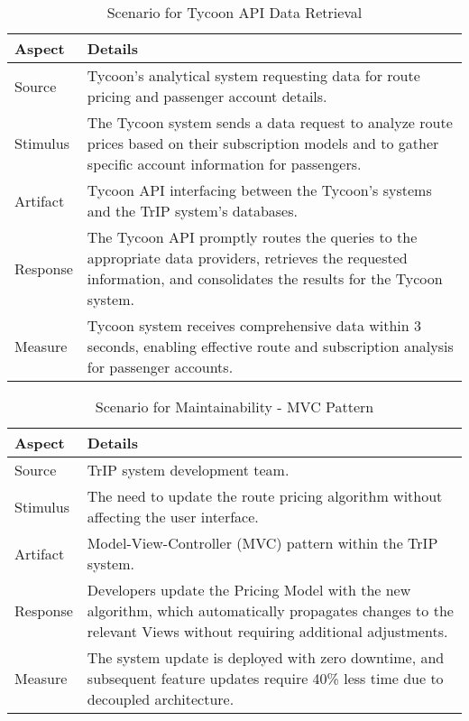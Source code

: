 \begin{table}[H]
    \centering
    \begin{tabularx}{\textwidth}{@{} lX @{}}
    \toprule
    \textbf{Aspect} & \textbf{Details} \\
    \midrule
    Source & Tycoon's analytical system requesting data for route pricing and passenger account details. \\
    Stimulus & The Tycoon system sends a data request to analyze route prices based on their subscription models and to gather specific account information for passengers. \\
    Artifact & Tycoon API interfacing between the Tycoon's systems and the TrIP system's databases. \\
    Response & The Tycoon API promptly routes the queries to the appropriate data providers, retrieves the requested information, and consolidates the results for the Tycoon system. \\
    Measure & Tycoon system receives comprehensive data within 3 seconds, enabling effective route and subscription analysis for passenger accounts. \\
    \bottomrule
    \end{tabularx}
    \caption{Scenario for Tycoon API Data Retrieval}
    \label{table:tycoon_api_data_retrieval}
\end{table}

\begin{table}[H]
    \centering
    \begin{tabularx}{\textwidth}{@{} lX @{}}
    \toprule
    \textbf{Aspect} & \textbf{Details} \\
    \midrule
    Source & TrIP system development team. \\
    Stimulus & The need to update the route pricing algorithm without affecting the user interface. \\
    Artifact & Model-View-Controller (MVC) pattern within the TrIP system. \\
    Response & Developers update the Pricing Model with the new algorithm, which automatically propagates changes to the relevant Views without requiring additional adjustments. \\
    Measure & The system update is deployed with zero downtime, and subsequent feature updates require 40\% less time due to decoupled architecture. \\
    \bottomrule
    \end{tabularx}
    \caption{Scenario for Maintainability - MVC Pattern}
    \label{table:mvc_maintainability}
\end{table}


